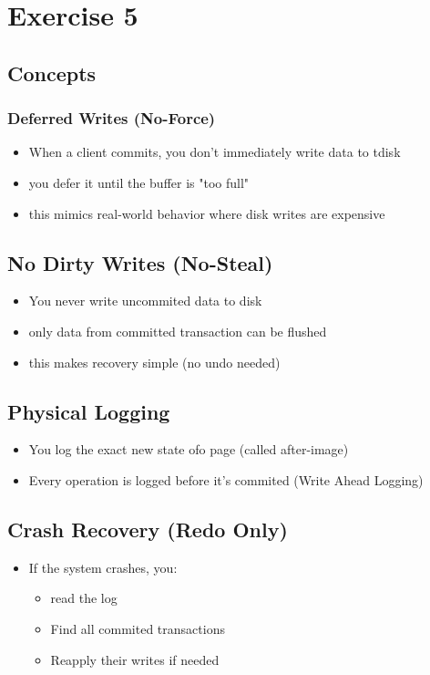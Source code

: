 \chapter{Exercise 5}

\section{Concepts}
\subsection{Deferred Writes (No-Force)}
\begin{itemize}
	\item When a client commits, you don't immediately write data to tdisk 
	\item you defer it until the buffer is "too full"
	\item this mimics real-world behavior where disk writes are expensive
\end{itemize}

\section{No Dirty Writes (No-Steal)}
\begin{itemize}
	\item You never write uncommited data to disk
	\item only data from committed transaction can be flushed
	\item this makes recovery simple (no undo needed)
\end{itemize}

\section{Physical Logging}
\begin{itemize}
	\item You log the exact new state ofo page (called after-image)
	\item Every operation is logged before it's commited (Write Ahead Logging)
\end{itemize}

\section{Crash Recovery (Redo Only)}
\begin{itemize}
	\item If the system crashes, you: 
	\begin{itemize}
		\item read the log
		\item Find all commited transactions
		\item Reapply their writes if needed
	\end{itemize}
\end{itemize}

